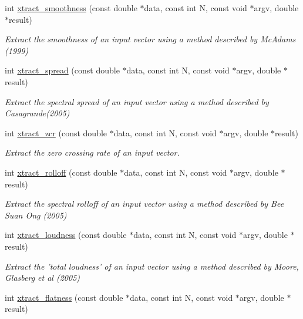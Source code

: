\begin{DoxyCompactItemize}
\item 
int \hyperlink{group__scalar_gad67bcaff8fb4f374992a19a9db5d6f83}{xtract\-\_\-smoothness} (const double $\ast$data, const int N, const void $\ast$argv, double $\ast$result)
\begin{DoxyCompactList}\small\item\em Extract the smoothness of an input vector using a method described by Mc\-Adams (1999) \end{DoxyCompactList}\item 
int \hyperlink{group__scalar_gad8b61275b68ca0b2436594e72826bb96}{xtract\-\_\-spread} (const double $\ast$data, const int N, const void $\ast$argv, double $\ast$result)
\begin{DoxyCompactList}\small\item\em Extract the spectral spread of an input vector using a method described by Casagrande(2005) \end{DoxyCompactList}\item 
int \hyperlink{group__scalar_gade0f5b9e646240e93fe899a600ddb838}{xtract\-\_\-zcr} (const double $\ast$data, const int N, const void $\ast$argv, double $\ast$result)
\begin{DoxyCompactList}\small\item\em Extract the zero crossing rate of an input vector. \end{DoxyCompactList}\item 
int \hyperlink{group__scalar_ga744d31215cb07152cfa631330d8c3361}{xtract\-\_\-rolloff} (const double $\ast$data, const int N, const void $\ast$argv, double $\ast$result)
\begin{DoxyCompactList}\small\item\em Extract the spectral rolloff of an input vector using a method described by Bee Suan Ong (2005) \end{DoxyCompactList}\item 
int \hyperlink{group__scalar_ga87c9964f24d9772a3f9fade38d35c154}{xtract\-\_\-loudness} (const double $\ast$data, const int N, const void $\ast$argv, double $\ast$result)
\begin{DoxyCompactList}\small\item\em Extract the 'total loudness' of an input vector using a method described by Moore, Glasberg et al (2005) \end{DoxyCompactList}\item 
int \hyperlink{group__scalar_ga72703321ae3e9aab8900afc9ccd47778}{xtract\-\_\-flatness} (const double $\ast$data, const int N, const void $\ast$argv, double $\ast$result)

\end{DoxyCompactItemize}
